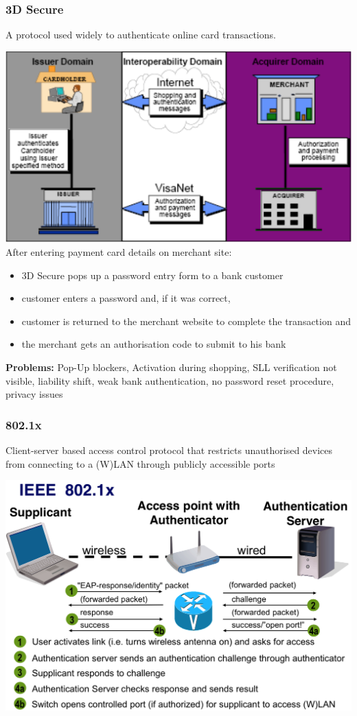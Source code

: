 \documentclass[fs, footer]{latex4ei}
\begin{document}
\begin{multicols*}{4}
\subsubsection{3D Secure}
A protocol used widely to authenticate online card transactions. 

\includegraphics[width=\columnwidth]{img/3DSecure.png}
After entering payment card details on merchant site:
\begin{itemize}
\item 3D Secure pops up a password entry form to a bank customer
\item customer enters a password and, if it was correct,
\item customer is returned to the merchant website to complete the
transaction and
\item the merchant gets an authorisation code to submit to his bank
\end{itemize}

\textbf{Problems:} Pop-Up blockers, Activation during shopping, SLL verification not visible, liability shift, weak bank authentication, no password reset procedure, privacy issues\\
\subsubsection{802.1x}
Client-server based access control protocol that restricts unauthorised devices from connecting to a (W)LAN through publicly accessible ports

\includegraphics[width=\columnwidth]{img/8021x.png}


\end{multicols*}
\end{document}
